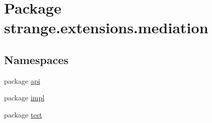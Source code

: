 \hypertarget{namespacestrange_1_1extensions_1_1mediation}{\section{Package strange.\-extensions.\-mediation}
\label{namespacestrange_1_1extensions_1_1mediation}
}
\subsection*{Namespaces}
\begin{DoxyCompactItemize}
\item 
package \hyperlink{namespacestrange_1_1extensions_1_1mediation_1_1api}{api}
\item 
package \hyperlink{namespacestrange_1_1extensions_1_1mediation_1_1impl}{impl}
\item 
package \hyperlink{namespacestrange_1_1extensions_1_1mediation_1_1test}{test}
\end{DoxyCompactItemize}
